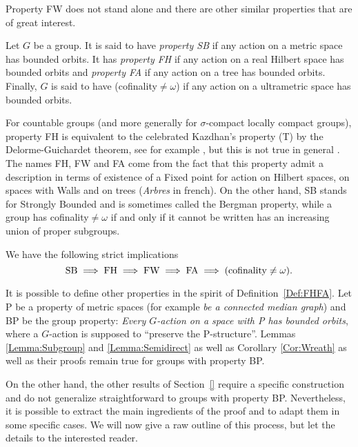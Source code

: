 Property FW does not stand alone and there are other similar properties that are of great interest.
\begin{defn}\label{Def:FHFA}
Let $G$ be a group.
It is said to have \emph{property SB} if any action on a metric space has bounded orbits.
It has \emph{property FH} if any action on a real Hilbert space has bounded orbits and \emph{property FA} if any action on a tree has bounded orbits.
Finally, $G$ is said to have (cofinality$\neq\omega$) if any action on a ultrametric space has bounded orbits.
\end{defn}
For countable groups (and more generally for $\sigma$-compact locally compact groups), property FH is equivalent to the celebrated Kazdhan's property (T) by the Delorme-Guichardet theorem, see for example \cite{MR2415834}, but this is not true in general \cite{MR2240370}.
The names FH, FW and FA come from the fact that this property admit a description in terms of existence of a Fixed point for action on Hilbert spaces, on spaces with Walls and on trees (\emph{Arbres} in french).
On the other hand, SB stands for Strongly Bounded and is sometimes called the Bergman property, while a group has cofinality$\neq\omega$ if and only if it cannot be written has an increasing union of proper subgroups.

We have the following strict implications \cite{MR1432323,MR0476875 ,MR3299841,2013arXiv1302.5982C}
\[
\textnormal{SB}\implies \textnormal{FH}\implies \textnormal{FW}\implies \textnormal{FA}\implies(\textnormal{cofinality}\neq\omega).
\]

It is possible to define other properties in the spirit of Definition~\ref{Def:FHFA}.
Let P be a property of metric spaces (for example \emph{be a connected median graph}) and BP be the group property: \emph{Every $G$-action on a space with P has bounded orbits}, where a $G$-action is supposed to ``preserve the P-structure''.
Lemmas \ref{Lemma:Subgroup} and \ref{Lemma:Semidirect} as well as Corollary \ref{Cor:Wreath} as well as their proofs remain true for groups with property BP.

On the other hand, the other results of Section~\ref{} require a specific construction and do not generalize straightforward to groups with property BP.
Nevertheless, it is possible to extract the main ingredients of the proof and to adapt them in some specific cases.
We will now give a raw outline of this process, but let the details to the interested reader.

